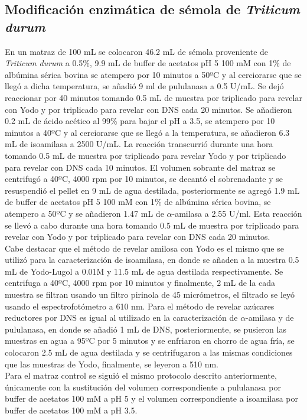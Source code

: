 \documentclass{article}
\begin{document}
\subsection{Modificación enzimática de sémola de \textit{Triticum durum}}
	En un matraz de 100 mL se colocaron 46.2 mL de sémola proveniente de \textit{Triticum durum} a 0.5\%, 9.9 mL de buffer de acetatos pH 5 100 mM con 1\% de albúmina sérica bovina se atempero por 10 minutos a 50ºC y al cerciorarse que se llegó a dicha temperatura, se añadió 9 ml de pululanasa a 0.5 U/mL. Se dejó reaccionar por 40 minutos tomando 0.5 mL de muestra por triplicado para revelar con Yodo y por triplicado para revelar con DNS cada 20 minutos. Se añadieron 0.2 mL de ácido acético al 99\% para bajar el pH a 3.5, se atempero por 10 minutos a 40ºC y al cerciorarse que se llegó a la temperatura, se añadieron 6.3 mL de isoamilasa a 2500 U/mL. La reacción transcurrió durante una hora tomando 0.5 mL de muestra por triplicado para revelar Yodo y por triplicado para revelar con DNS cada 10 minutos. El volumen sobrante del matraz se centrifugó a 40ºC, 4000 rpm por 10 minutos, se decantó el sobrenadante y se resuspendió el pellet en 9 mL de agua destilada, posteriormente se agregó 1.9 mL de buffer de acetatos pH 5 100 mM con 1\% de albúmina sérica bovina, se atempero a 50ºC y se añadieron 1.47 mL de $\alpha$-amilasa a 2.55 U/ml. Esta reacción se llevó a cabo durante una hora tomando 0.5 mL de muestra por triplicado para revelar con Yodo y por triplicado para revelar con DNS cada 20 minutos.\\
	
	Cabe destacar que el método de revelar amilosa con Yodo es el mismo que se utilizó para la caracterización de isoamilasa, en donde se añaden a la muestra 0.5 mL de Yodo-Lugol a 0.01M y 11.5 mL de agua destilada respectivamente. Se centrifuga a 40ºC, 4000 rpm por 10 minutos y finalmente, 2 mL de la cada muestra se filtran usando un filtro pirinola de 45 micrómetros, el filtrado se leyó usando el espectrofotómetro a 610 nm. Para el método de revelar azúcares reductores por DNS es igual al utilizado en la caracterización de $\alpha$-amilasa y de pululanasa, en donde se añadió 1 mL de DNS, posteriormente, se pusieron las muestras en agua a 95ºC por 5 minutos y se enfriaron en chorro de agua fría, se colocaron 2.5 mL de agua destilada y se centrifugaron a las mismas condiciones que las muestras de Yodo, finalmente, se leyeron a 510 nm.\\
	
	Para el matraz control se siguió el mismo protocolo descrito anteriormente, únicamente con la sustitución del volumen correspondiente a pululanasa por buffer de acetatos 100 mM a pH 5 y el volumen correspondiente a isoamilasa por buffer de acetatos 100 mM a pH 3.5.
	
\end{document}
